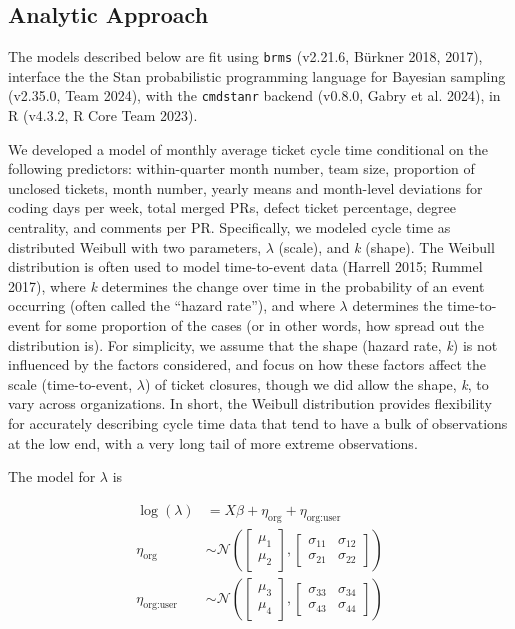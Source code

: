 \documentclass[
]{article}
\begin{document}
\subsection{Analytic Approach}\label{analytic-approach}

The models described below are fit using \texttt{brms} (v2.21.6, Bürkner
2018, 2017), interface the the Stan probabilistic programming language
for Bayesian sampling (v2.35.0, Team 2024), with the \texttt{cmdstanr}
backend (v0.8.0, Gabry et al. 2024), in R (v4.3.2, R Core Team 2023).

We developed a model of monthly average ticket cycle time conditional on
the following predictors: within-quarter month number, team size,
proportion of unclosed tickets, month number, yearly means and
month-level deviations for coding days per week, total merged PRs,
defect ticket percentage, degree centrality, and comments per PR.
Specifically, we modeled cycle time as distributed Weibull with two
parameters, \(\lambda\) (scale), and \emph{k} (shape). The Weibull
distribution is often used to model time-to-event data (Harrell 2015;
Rummel 2017), where \emph{k} determines the change over time in the
probability of an event occurring (often called the ``hazard rate''),
and where \(\lambda\) determines the time-to-event for some proportion
of the cases (or in other words, how spread out the distribution is).
For simplicity, we assume that the shape (hazard rate, \emph{k}) is not
influenced by the factors considered, and focus on how these factors
affect the scale (time-to-event, \(\lambda\)) of ticket closures, though
we did allow the shape, \emph{k}, to vary across organizations. In
short, the Weibull distribution provides flexibility for accurately
describing cycle time data that tend to have a bulk of observations at
the low end, with a very long tail of more extreme observations.

The model for \(\lambda\) is

\begin{equation}
\begin{aligned}
\log(\lambda) &= X\beta + \eta_{\text{org}} + \eta_{\text{org:user}} \\
\eta_{\text{org}} &\sim \mathcal{N}\left(\begin{bmatrix} \mu_1 \\ \mu_2 \end{bmatrix}, \begin{bmatrix} \sigma_{11} & \sigma_{12} \\ \sigma_{21} & \sigma_{22} \end{bmatrix}\right) \\
\eta_{\text{org:user}} &\sim \mathcal{N}\left(\begin{bmatrix} \mu_3 \\ \mu_4 \end{bmatrix}, \begin{bmatrix} \sigma_{33} & \sigma_{34} \\ \sigma_{43} & \sigma_{44} \end{bmatrix}\right) 
\end{aligned}
\end{equation}
\end{document}
